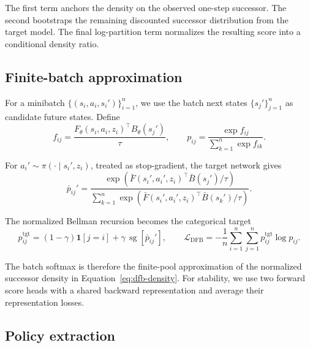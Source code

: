 \documentclass[11pt]{article}
\newcommand{\sg}{\operatorname{sg}}
\begin{document}
The first term anchors the density on the observed one-step successor. The second bootstraps the remaining discounted successor distribution from the target model. The final log-partition term normalizes the resulting score into a conditional density ratio.


\subsection{Finite-batch approximation}

For a minibatch $\{(s_i,a_i,s_i')\}_{i=1}^{n}$, we use the batch next states $\{s_j'\}_{j=1}^{n}$ as candidate future states. Define
\begin{equation}
    f_{ij}
    =
    \frac{F_\theta(s_i,a_i,z_i)^\top B_\theta(s_j')}{\tau},
    \qquad
    p_{ij}
    =
    \frac{\exp f_{ij}}
    {\sum_{k=1}^{n}\exp f_{ik}}.
    \label{eq:batch-density}
\end{equation}

For $a_i'\sim\pi(\cdot\mid s_i',z_i)$, treated as stop-gradient, the target network gives
\begin{equation}
    \bar p_{ij}'
    =
    \frac{
        \exp\left(
            \bar F(s_i',a_i',z_i)^\top\bar B(s_j')/\tau
        \right)
    }{
        \sum_{k=1}^{n}
        \exp\left(
            \bar F(s_i',a_i',z_i)^\top\bar B(s_k')/\tau
        \right)
    }.
    \label{eq:batch-target-density}
\end{equation}

The normalized Bellman recursion becomes the categorical target
\begin{equation}
    p_{ij}^{\mathrm{tgt}}
    =
    (1-\gamma)\mathbf 1[j=i]
    +
    \gamma\,\sg\left[\bar p_{ij}'\right],
    \qquad
    \mathcal L_{\mathrm{DFB}}
    =
    -\frac{1}{n}
    \sum_{i=1}^{n}
    \sum_{j=1}^{n}
    p_{ij}^{\mathrm{tgt}}\log p_{ij}.
    \label{eq:dfb-finite-pool}
\end{equation}

The batch softmax is therefore the finite-pool approximation of the normalized successor density in Equation~\eqref{eq:dfb-density}. For stability, we use two forward score heads with a shared backward representation and average their representation losses.


\subsection{Policy extraction}
\label{sec:policy-extraction}
\end{document}
